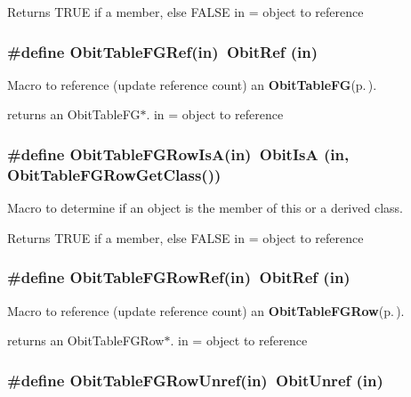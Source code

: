 Returns TRUE if a member, else FALSE in = object to reference 
\subsubsection{\setlength{\rightskip}{0pt plus 5cm}\#define Obit\-Table\-FGRef(in)\ Obit\-Ref (in)}\label{ObitTableFG_8h_a2}


Macro to reference (update reference count) an {\bf Obit\-Table\-FG}{\rm (p.\,\pageref{structObitTableFG})}. 

returns an Obit\-Table\-FG$\ast$. in = object to reference 
\subsubsection{\setlength{\rightskip}{0pt plus 5cm}\#define Obit\-Table\-FGRow\-Is\-A(in)\ Obit\-Is\-A (in, Obit\-Table\-FGRow\-Get\-Class())}\label{ObitTableFG_8h_a6}


Macro to determine if an object is the member of this or a derived class. 

Returns TRUE if a member, else FALSE in = object to reference 
\subsubsection{\setlength{\rightskip}{0pt plus 5cm}\#define Obit\-Table\-FGRow\-Ref(in)\ Obit\-Ref (in)}\label{ObitTableFG_8h_a5}


Macro to reference (update reference count) an {\bf Obit\-Table\-FGRow}{\rm (p.\,\pageref{structObitTableFGRow})}. 

returns an Obit\-Table\-FGRow$\ast$. in = object to reference 
\subsubsection{\setlength{\rightskip}{0pt plus 5cm}\#define Obit\-Table\-FGRow\-Unref(in)\ Obit\-Unref (in)}\label{ObitTableFG_8h_a4}


